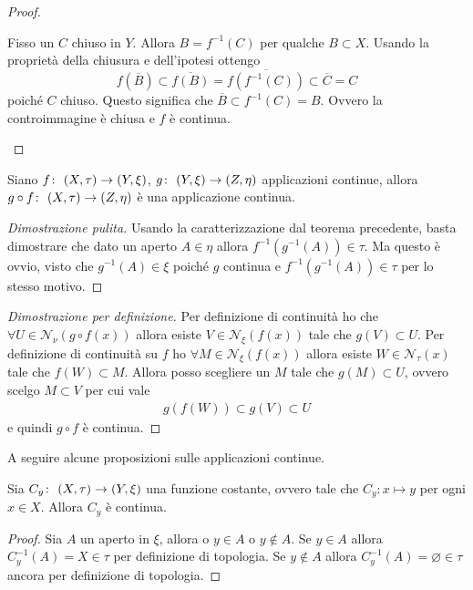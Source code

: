 \begin{proof}
\begin{enumerate}
		Fisso un $C$ chiuso in $Y$. Allora $B = f^{-1}(C)$ per qualche $B \subset X$. Usando la proprietà della chiusura e dell'ipotesi ottengo  
		\begin{equation}
			f(\overline{B}) \subset \overline{f(B)} = \overline{f(f^{-1}(C))} \subset \overline{C} = C
		\end{equation}
		poiché $C$ chiuso. Questo significa che $\overline{B} \subset f^{-1}(C) = B$. Ovvero la controimmagine è chiusa e $f$ è continua.
\end{enumerate}
\end{proof}

\begin{theorem}
	Siano $f \colon\ (X, \tau) \rightarrow (Y, \xi)$, $g \colon\ (Y,\xi) \rightarrow (Z, \eta)$ applicazioni continue, allora $g \circ f \colon\ (X,\tau) \rightarrow (Z,\eta)$ è una applicazione continua.
\end{theorem}
\begin{proof}[Dimostrazione pulita]
	Usando la caratterizzazione dal teorema precedente, basta dimostrare che dato un aperto $A \in \eta$ allora $f^{-1}(g^{-1}(A)) \in \tau$. Ma questo è ovvio, visto che $g^{-1}(A) \in \xi$ poiché $g$ continua e $f^{-1}(g^{-1}(A)) \in \tau$ per lo stesso motivo.  
\end{proof}
\begin{proof}[Dimostrazione per definizione]
	Per definizione di continuità ho che $\forall U \in \mathcal{N}_\nu(g \circ f (x))$ allora esiste $V \in \mathcal{N}_\xi(f(x))$ tale che $g(V) \subset U$. Per definizione di continuità su $f$ ho $\forall M \in \mathcal{N}_\xi(f (x))$ allora esiste $W \in \mathcal{N}_\tau(x)$ tale che $f(W) \subset M$. Allora posso scegliere un $M$ tale che $g(M) \subset U$, ovvero scelgo $M \subset V$ per cui vale 
	\begin{equation}
	\begin{aligned}
		g(f(W)) \subset g(V) \subset U
	\end{aligned}
	\end{equation}
	e quindi $g \circ f$ è continua.
\end{proof}

A seguire alcune proposizioni sulle applicazioni continue.

\begin{theorem}
	Sia $C_y \colon\ (X,\tau) \rightarrow (Y,\xi)$ una funzione costante, ovvero tale che $C_y : x \mapsto y$ per ogni $x \in X$. Allora $C_y$ è continua.
\end{theorem}
\begin{proof}
	Sia $A$ un aperto in $\xi$, allora o $y \in A$ o $y \notin A$. Se $y \in A$ allora $C^{-1}_y(A) = X \in \tau$ per definizione di topologia. Se $y \notin A$ allora $C^{-1}_y(A) = \varnothing \in \tau$ ancora per definizione di topologia.
\end{proof}

